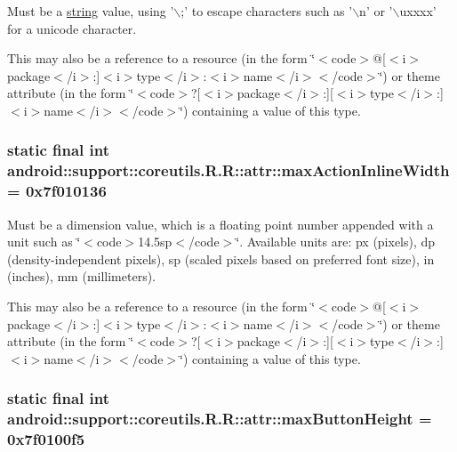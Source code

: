 Must be a \hyperlink{classandroid_1_1support_1_1coreutils_1_1_r_1_1string}{string} value, using '$\backslash$;' to escape characters such as '$\backslash$n' or '$\backslash$uxxxx' for a unicode character. 

This may also be a reference to a resource (in the form \char`\"{}$<$code$>$@\mbox{[}$<$i$>$package$<$/i$>$:\mbox{]}$<$i$>$type$<$/i$>$:$<$i$>$name$<$/i$>$$<$/code$>$\char`\"{}) or theme attribute (in the form \char`\"{}$<$code$>$?\mbox{[}$<$i$>$package$<$/i$>$:\mbox{]}\mbox{[}$<$i$>$type$<$/i$>$:\mbox{]}$<$i$>$name$<$/i$>$$<$/code$>$\char`\"{}) containing a value of this type. \hypertarget{classandroid_1_1support_1_1coreutils_1_1_r_1_1attr_c85b763d6ffba65e183f55d61f4f6b25}{
\subsubsection[{maxActionInlineWidth}]{\setlength{\rightskip}{0pt plus 5cm}static final int android::support::coreutils.R.R::attr::maxActionInlineWidth = 0x7f010136}}
\label{classandroid_1_1support_1_1coreutils_1_1_r_1_1attr_c85b763d6ffba65e183f55d61f4f6b25}


Must be a dimension value, which is a floating point number appended with a unit such as \char`\"{}$<$code$>$14.5sp$<$/code$>$\char`\"{}. Available units are: px (pixels), dp (density-independent pixels), sp (scaled pixels based on preferred font size), in (inches), mm (millimeters). 

This may also be a reference to a resource (in the form \char`\"{}$<$code$>$@\mbox{[}$<$i$>$package$<$/i$>$:\mbox{]}$<$i$>$type$<$/i$>$:$<$i$>$name$<$/i$>$$<$/code$>$\char`\"{}) or theme attribute (in the form \char`\"{}$<$code$>$?\mbox{[}$<$i$>$package$<$/i$>$:\mbox{]}\mbox{[}$<$i$>$type$<$/i$>$:\mbox{]}$<$i$>$name$<$/i$>$$<$/code$>$\char`\"{}) containing a value of this type. \hypertarget{classandroid_1_1support_1_1coreutils_1_1_r_1_1attr_d1768ffe7f18fc78a19ac025ef1350ba}{
\subsubsection[{maxButtonHeight}]{\setlength{\rightskip}{0pt plus 5cm}static final int android::support::coreutils.R.R::attr::maxButtonHeight = 0x7f0100f5}}
\label{classandroid_1_1support_1_1coreutils_1_1_r_1_1attr_d1768ffe7f18fc78a19ac025ef1350ba}


